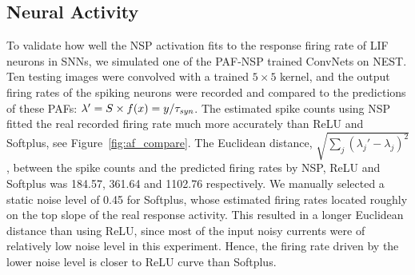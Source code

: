 \documentclass[10pt,journal,compsoc]{IEEEtran}
\begin{document}
	\subsection{Neural Activity}
	\label{subsec:activity}
	To validate how well the NSP activation fits to the response firing rate of LIF neurons in SNNs, we simulated one of the PAF-NSP trained ConvNets on NEST.
	Ten testing images were convolved with a trained $5\times5$ kernel, and the output firing rates of the spiking neurons were recorded and compared to the predictions of these PAFs: $\lambda' = S \times f(x) = y/\tau_{\textit{\textrm{syn}}}$.
	The estimated spike counts using NSP fitted the real recorded firing rate much more accurately than ReLU and Softplus, see Figure~\ref{fig:af_compare}.
	The Euclidean distance, $\sqrt{\sum_{j}(\lambda_j' - \lambda_j)^2}$, between the spike counts and the predicted firing rates by NSP, ReLU and Softplus was 184.57, 361.64 and 1102.76 respectively.
	We manually selected a static noise level of 0.45 for Softplus, whose estimated firing rates located roughly on the top slope of the real response activity.
	This resulted in a longer Euclidean distance than using ReLU, since most of the input noisy currents were of relatively low noise level in this experiment.
	Hence, the firing rate driven by the lower noise level is closer to ReLU curve than Softplus.
	
\end{document}
